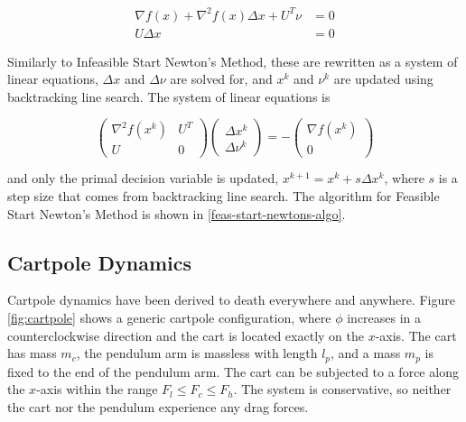 \documentclass{exam}
\begin{document}
\begin{multicols}{2}
\begin{equation}
    \label{feas-newt-kkt-conds}
    \begin{aligned}
        \nabla f(x) + \nabla^2 f(x) \Delta x + U^T\nu &= 0 \\
        U \Delta x &= 0
    \end{aligned}
\end{equation}

Similarly to Infeasible Start Newton's Method, these are rewritten as a system of linear equations, $\Delta x$ and $\Delta \nu$ are solved for, and $x^k$ and $\nu^k$ are updated using backtracking line search. The system of linear equations is

\begin{equation}
    \begin{pmatrix}
        \nabla^2 f(x^k) & U^T \\
        U & 0
    \end{pmatrix}
    \begin{pmatrix}
        \Delta x^k \\
        \Delta \nu^k
    \end{pmatrix}
    = -\begin{pmatrix}
       \nabla f(x^k) \\
       0
    \end{pmatrix}
\end{equation}

and only the primal decision variable is updated, $x^{k+1} = x^k + s \Delta x^k$, where $s$ is a step size that comes from backtracking line search. The algorithm for Feasible Start Newton's Method is shown in \ref{feas-start-newtons-algo}.

\subsection{Cartpole Dynamics}

Cartpole dynamics have been derived to death everywhere and anywhere. Figure \ref{fig:cartpole} shows a generic cartpole configuration, where $\phi$ increases in a counterclockwise direction and the cart is located exactly on the $x$-axis. The cart has mass $m_c$, the pendulum arm is massless with length $l_{p}$, and a mass $m_{p}$ is fixed to the end of the pendulum arm. The cart can be subjected to a force along the $x$-axis within the range $F_l \leq F_c \leq F_h$. The system is conservative, so neither the cart nor the pendulum experience any drag forces.


\end{multicols}
\end{document}
